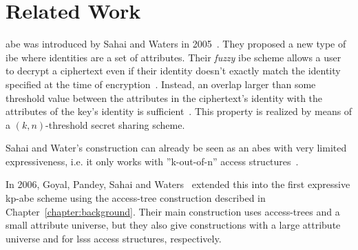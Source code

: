 \chapter{Related Work}



\acrlong{abe} was introduced by Sahai and Waters in 2005~\cite{sahai_fuzzy_2005}.
They proposed a new type of \gls{ibe} where identities are a set of attributes.
Their \emph{fuzzy} \gls{ibe} scheme allows a user to decrypt a ciphertext even if their identity doesn't exactly match the identity specified at the time of encryption~\cite{sahai_fuzzy_2005}.
Instead, an overlap larger than some threshold value between the attributes in the ciphertext's identity with the attributes of the key's identity is sufficient~\cite{sahai_fuzzy_2005}.
This property is realized by means of a $(k, n)$-threshold secret sharing scheme.

Sahai and Water's construction can already be seen as an \acrshort{abes} with very limited expressiveness, i.e. it only works with ''k-out-of-n'' access structures~\cite{goyal_attribute-based_2006}.

In 2006, Goyal, Pandey, Sahai and Waters~\cite{goyal_attribute-based_2006} extended this into the first expressive \acrshort{kp-abe} scheme using the \gls{access-tree} construction described in Chapter~\ref{chapter:background}.
Their main construction uses \glspl{access-tree} and a small attribute universe, but they also give constructions with a large attribute universe and for \gls{lsss} access structures, respectively.

